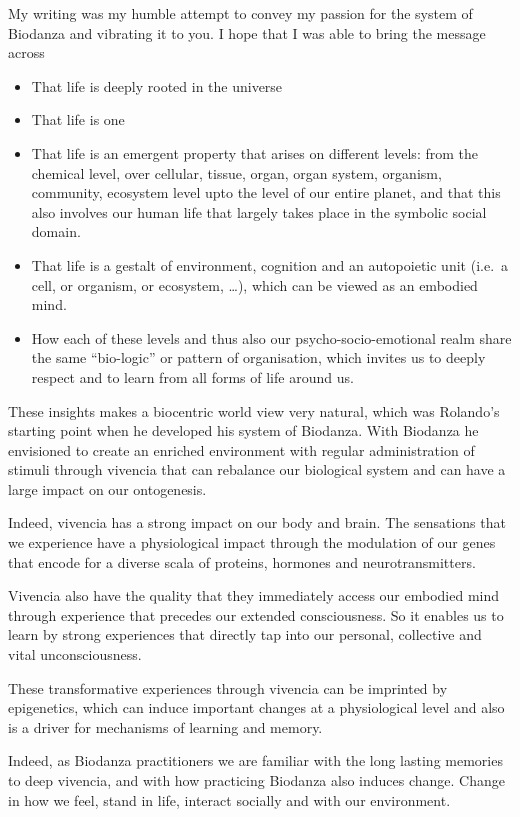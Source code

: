 \documentclass[
  11pt,
]{book}
\begin{document}
My writing was my humble attempt to convey my passion for the system of Biodanza and vibrating it to you. I hope that I was able to bring the message across

\begin{itemize}
\item
  That life is deeply rooted in the universe
\item
  That life is one
\item
  That life is an emergent property that arises on different levels: from the chemical level, over cellular, tissue, organ, organ system, organism, community, ecosystem level upto the level of our entire planet, and that this also involves our human life that largely takes place in the symbolic social domain.
\item
  That life is a gestalt of environment, cognition and an autopoietic unit (i.e.~a cell, or organism, or ecosystem, \ldots), which can be viewed as an embodied mind.
\item
  How each of these levels and thus also our psycho-socio-emotional realm share the same ``bio-logic'' or pattern of organisation, which invites us to deeply respect and to learn from all forms of life around us.
\end{itemize}

These insights makes a biocentric world view very natural, which was Rolando's starting point when he developed his system of Biodanza. With Biodanza he envisioned to create an enriched environment with regular administration of stimuli through vivencia that can rebalance our biological system and can have a large impact on our ontogenesis.

Indeed, vivencia has a strong impact on our body and brain. The sensations that we experience have a physiological impact through the modulation of our genes that encode for a diverse scala of proteins, hormones and neurotransmitters.

Vivencia also have the quality that they immediately access our embodied mind through experience that precedes our extended consciousness. So it enables us to learn by strong experiences that directly tap into our personal, collective and vital unconsciousness.

These transformative experiences through vivencia can be imprinted by epigenetics, which can induce important changes at a physiological level and also is a driver for mechanisms of learning and memory.

Indeed, as Biodanza practitioners we are familiar with the long lasting memories to deep vivencia, and with how practicing Biodanza also induces change.
Change in how we feel, stand in life, interact socially and with our environment.
\end{document}

